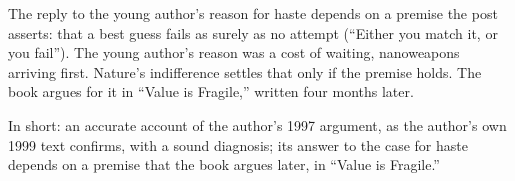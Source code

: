 \begin{afterword}
The reply to the young author's reason for haste depends on a premise the post asserts: that a best guess fails as surely as no attempt (``Either you match it, or you fail''). The young author's reason was a cost of waiting, nanoweapons arriving first. Nature's indifference settles that only if the premise holds. The book argues for it in ``Value is Fragile,'' written four months later.

In short: an accurate account of the author's 1997 argument, as the author's own 1999 text confirms, with a sound diagnosis; its answer to the case for haste depends on a premise that the book argues later, in ``Value is Fragile.''
\end{afterword}
